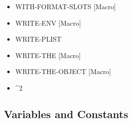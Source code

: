 \documentclass [11pt]{book}
\begin{document}
\begin{itemize}
\item {}WITH-FORMAT-SLOTS [Macro]

\item {}WRITE-ENV [Macro]

\item {}WRITE-PLIST

\item {}WRITE-THE [Macro]

\item {}WRITE-THE-OBJECT [Macro]

\item {}^2

\end{itemize}



\subsection{Variables and Constants}

\label{subsec:variablesandconstants}
\end{document}
